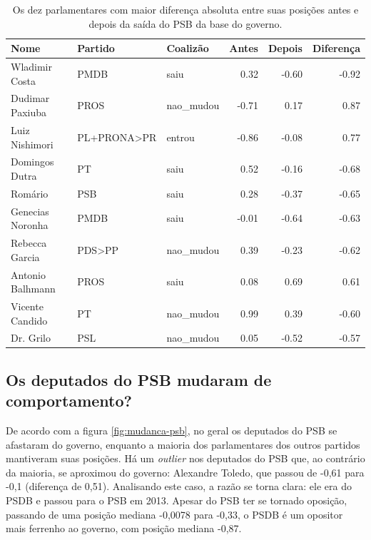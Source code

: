 \documentclass[a4paper,titlepage]{ppgi}\usepackage[]{graphicx}\usepackage[]{color}
\newenvironment{knitrout}{}{} %
\begin{document}
{\begin{table}
\centering
\begin{knitrout}
\color{fgcolor}
\begin{tabular}{l|l|l|r|r|r}
\hline
Nome & Partido & Coalizão & Antes & Depois & Diferença\\
\hline
Wladimir Costa & PMDB & saiu & 0.32 & -0.60 & -0.92\\
\hline
Dudimar Paxiuba & PROS & nao\_mudou & -0.71 & 0.17 & 0.87\\
\hline
Luiz Nishimori & PL+PRONA>PR & entrou & -0.86 & -0.08 & 0.77\\
\hline
Domingos Dutra & PT & saiu & 0.52 & -0.16 & -0.68\\
\hline
Romário & PSB & saiu & 0.28 & -0.37 & -0.65\\
\hline
Genecias Noronha & PMDB & saiu & -0.01 & -0.64 & -0.63\\
\hline
Rebecca Garcia & PDS>PP & nao\_mudou & 0.39 & -0.23 & -0.62\\
\hline
Antonio Balhmann & PROS & saiu & 0.08 & 0.69 & 0.61\\
\hline
Vicente Candido & PT & nao\_mudou & 0.99 & 0.39 & -0.60\\
\hline
Dr. Grilo & PSL & nao\_mudou & 0.05 & -0.52 & -0.57\\
\hline
\end{tabular}


\end{knitrout}
\caption{Os dez parlamentares com maior diferença absoluta entre suas posições
antes e depois da saída do PSB da base do governo.}
\label{table:top-10-diffs}
\end{table}

\subsection{Os deputados do PSB mudaram de comportamento?}



De acordo com a figura \ref{fig:mudanca-psb}, no geral os deputados do PSB se
afastaram do governo, enquanto a maioria dos parlamentares dos outros partidos
mantiveram suas posições. Há um \emph{outlier} nos deputados do PSB que, ao
contrário da maioria, se aproximou do governo: Alexandre Toledo, que
passou de -0,61 para -0,1 (diferença
de 0,51). Analisando este caso, a razão se torna clara: ele
era do PSDB e passou para o PSB em 2013. Apesar do PSB ter se tornado oposição,
passando de uma posição mediana -0,0078
para -0,33, o PSDB é um opositor mais
ferrenho ao governo, com posição mediana -0,87.

}
\end{document}
